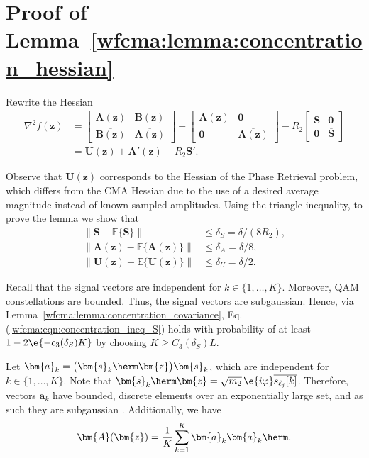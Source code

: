 \section{Proof of Lemma~\ref{wfcma:lemma:concentration_hessian}}\label{wfcma:appdx:concentration_hessian}

Rewrite the Hessian
\begin{align}
	\nabla^2f(\bm{z})&=\begin{bmatrix}
		\bm{A}(\bm{z})&\bm{B}(\bm{z})\\%
		\overline{\bm{B}(\bm{z})}&\overline{\bm{A}(\bm{z})}
	\end{bmatrix}+\begin{bmatrix}
		\bm{A}(\bm{z})&\bm{0}\\%
		\bm{0}&\overline{\bm{A}(\bm{z})}\end{bmatrix}
	-R_2\begin{bmatrix}
		\bm{S}&\bm{0}\\%
		\bm{0}&\overline{\bm{S}}\end{bmatrix}\nonumber\\
	&=\bm{U}(\bm{z})+\bm{A}'(\bm{z})-R_2\bm{S}'.\nonumber
\end{align}

Observe that $\bm{U}(\bm{z})$ corresponds to the Hessian of the Phase Retrieval problem, which differs from the CMA Hessian due to the use of a desired average magnitude instead of known sampled amplitudes. Using the triangle inequality, to prove the lemma we show that
\begin{align}
	\big\|\bm{S}-\mathbb{E}\{\bm{S}\}\big\|&\leq \delta_S={\delta}/{(8R_2)}, \label{wfcma:eqn:concentration_ineq_S}\\
	\big\|\bm{A}(\bm{z})-\mathbb{E}\{\bm{A}(\bm{z})\}\big\|&\leq \delta_A={\delta}/{8}, \label{wfcma:eqn:concentration_ineq_A}\\
	\|\bm{U}(\bm{z})-\mathbb{E}\{\bm{U}(\bm{z})\}\|&\leq 
	\delta_U={\delta}/{2}. \label{wfcma:eqn:concentration_ineq_U}
\end{align}

Recall that the signal vectors are independent for $k\in\{1,\ldots,K\}$. Moreover, QAM constellations are bounded. Thus, the signal vectors are subgaussian. Hence, via Lemma~\ref{wfcma:lemma:concentration_covariance},  Eq.(\ref{wfcma:eqn:concentration_ineq_S}) holds with probability of at least $1-2\e{-c_3(\delta_S)K}$ by choosing $K\geq C_3(\delta_S)L$.

Let $\bm{a}_k= \big(\bm{s}_k\herm\bm{z}\big) \bm{s}_k$, which are independent for $k\in\{1,\ldots,K\}$. Note that $\bm{s}_k\herm\bm{z}=\sqrt{m_2}\,\e{i\varphi}\overline{s_{\ell_j}[k]}$. Therefore, vectors $\bm{a}_k$ have bounded, discrete elements over an exponentially large set, and as such they are subgaussian \cite{Vershynin2018hdprobability}. Additionally, we have
\begin{align}
	\bm{A}(\bm{z})= \frac{1}{K}\sum_{k=1}^K \bm{a}_k\bm{a}_k\herm.\nonumber
\end{align}

